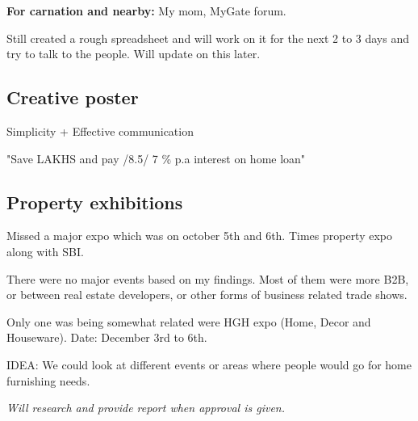 \documentclass[12pt, a4paper]{article}
\begin{document}
\noindent \textbf{For carnation and nearby:} My mom, MyGate forum.

\vspace{0.25cm}

\noindent Still created a rough spreadsheet and will work on it for the next 2 to 3 days and try to talk to the people. Will update on this later.

\subsection{Creative poster}

Simplicity + Effective communication

\vspace{0.3cm}

"Save LAKHS and pay /8.5/ 7 \% p.a interest on home loan"

\subsection{Property exhibitions}

Missed a major expo which was on october 5th and 6th. Times property expo along with SBI.

\noindent There were no major events based on my findings. Most of them were more B2B, or between real estate developers, or other forms of business related trade shows.

\noindent Only one was being somewhat related were HGH expo (Home, Decor and Houseware). Date: December 3rd to 6th.

\vspace{0.5cm}

\noindent IDEA: We could look at different events or areas where people would go for home furnishing needs.

\vspace{0.25cm}


\textit{Will research and provide report when approval is given.}
\end{document}
